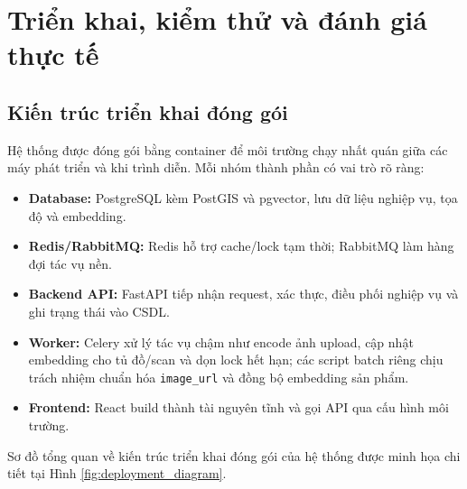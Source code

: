 \documentclass[12pt, a4paper]{article}
\begin{document}
\section{Triển khai, kiểm thử và đánh giá thực tế}

\subsection{Kiến trúc triển khai đóng gói}
Hệ thống được đóng gói bằng container để môi trường chạy nhất quán giữa các máy phát triển và khi trình diễn. Mỗi nhóm thành phần có vai trò rõ ràng:

\begin{itemize}
    \item \textbf{Database:} PostgreSQL kèm PostGIS và pgvector, lưu dữ liệu nghiệp vụ, tọa độ và embedding.
    
    \item \textbf{Redis/RabbitMQ:} Redis hỗ trợ cache/lock tạm thời; RabbitMQ làm hàng đợi tác vụ nền.
    
    \item \textbf{Backend API:} FastAPI tiếp nhận request, xác thực, điều phối nghiệp vụ và ghi trạng thái vào CSDL.
    
    \item \textbf{Worker:} Celery xử lý tác vụ chậm như encode ảnh upload, cập nhật embedding cho tủ đồ/scan và dọn lock hết hạn; các script batch riêng chịu trách nhiệm chuẩn hóa \texttt{image\_url} và đồng bộ embedding sản phẩm.
    
    \item \textbf{Frontend:} React build thành tài nguyên tĩnh và gọi API qua cấu hình môi trường.
\end{itemize}

\clearpage

Sơ đồ tổng quan về kiến trúc triển khai đóng gói của hệ thống được minh họa chi tiết tại Hình \ref{fig:deployment_diagram}.
\end{document}
